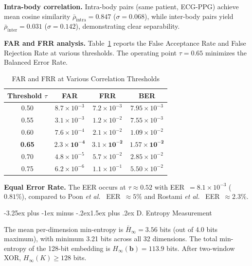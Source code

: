 \documentclass[10pt,twocolumn]{article}
\makeatletter
\renewcommand{\subsection}{\@startsection{subsection}{2}{\z@}%
  {-3.25ex plus -1ex minus -.2ex}{1.5ex plus .2ex}%
  {\normalfont\normalsize\bfseries\itshape}}
\newcommand{\etal}{\textit{et al.}}
\makeatother
\begin{document}
\textbf{Intra-body correlation.} Intra-body pairs (same patient, ECG-PPG) achieve mean cosine similarity $\bar{\rho}_{\text{intra}} = 0.847$ ($\sigma = 0.068$), while inter-body pairs yield $\bar{\rho}_{\text{inter}} = 0.031$ ($\sigma = 0.142$), demonstrating clear separability.

\textbf{FAR and FRR analysis.} Table~\ref{tab:far_frr} reports the False Acceptance Rate and False Rejection Rate at various thresholds. The operating point $\tau = 0.65$ minimizes the Balanced Error Rate.

\begin{table}[!t]
\centering
\caption{FAR and FRR at Various Correlation Thresholds}
\label{tab:far_frr}
\small
\begin{tabular}{c|c|c|c}
\hline
\textbf{Threshold $\tau$} & \textbf{FAR} & \textbf{FRR} & \textbf{BER} \\
\hline\hline
0.50 & $8.7 \times 10^{-3}$ & $7.2 \times 10^{-3}$ & $7.95 \times 10^{-3}$ \\
\hline
0.55 & $3.1 \times 10^{-3}$ & $1.2 \times 10^{-2}$ & $7.55 \times 10^{-3}$ \\
\hline
0.60 & $7.6 \times 10^{-4}$ & $2.1 \times 10^{-2}$ & $1.09 \times 10^{-2}$ \\
\hline
\textbf{0.65} & $\mathbf{2.3 \times 10^{-4}}$ & $\mathbf{3.1 \times 10^{-2}}$ & $\mathbf{1.57 \times 10^{-2}}$ \\
\hline
0.70 & $4.8 \times 10^{-5}$ & $5.7 \times 10^{-2}$ & $2.85 \times 10^{-2}$ \\
\hline
0.75 & $6.2 \times 10^{-6}$ & $1.1 \times 10^{-1}$ & $5.50 \times 10^{-2}$ \\
\hline
\end{tabular}
\end{table}

\textbf{Equal Error Rate.} The EER occurs at $\tau \approx 0.52$ with EER~$= 8.1 \times 10^{-3}$ ($0.81\%$), compared to Poon \etal~\cite{poon2006novel} EER~$\approx 5\%$ and Rostami \etal~\cite{rostami2013heart} EER~$\approx 2.3\%$.

\subsection{D. Entropy Measurement}
\label{subsec:entropy_measurement}

The mean per-dimension min-entropy is $\bar{H}_\infty = 3.56$ bits (out of 4.0 bits maximum), with minimum 3.21 bits across all 32 dimensions. The total min-entropy of the 128-bit embedding is $H_\infty(\mathbf{b}) = 113.9$ bits. After two-window XOR, $H_\infty(K) \geq 128$ bits.
\end{document}
